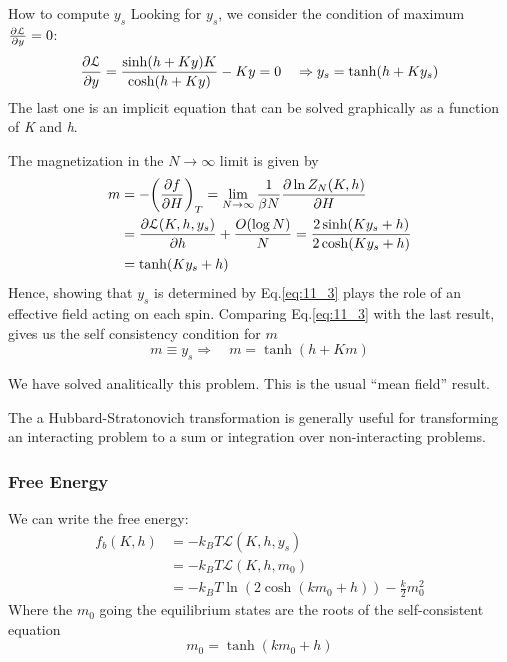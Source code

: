 \documentclass[../../Main/Main.tex]{subfiles}
\begin{document}
\begin{example}{How to compute \( y_s \)}{}
Looking for \( y_s \), we consider the condition of maximum \( \pdv{\mathcal{L} }{y} = 0  \):
\begin{equation}
  \pdv{\mathcal{L}}{y} = \frac{\sinh (h+Ky)K}{\cosh (h+Ky)} - Ky = 0 \quad   \Rightarrow y_s = \tanh (h+Ky_s)
  \label{eq:11_3}
\end{equation}
The last one is an implicit equation that can be solved graphically as a function of \emph{K} and \emph{h}.
\end{example}

The magnetization in the \( N \rightarrow \infty  \) limit is given by
\begin{equation*}
\begin{split}
m  &= - \qty( \pdv{f}{H})_T = \lim_{N \rightarrow \infty } \frac{1}{\beta N} \pdv{\ln{Z_N(K,h)} }{H}   \\
& =  \pdv{\mathcal{L} (K,h,y_s) }{h}  + \frac{O ( \log{N} )}{N} = \frac{2 \sinh(Ky_s+h)}{2 \cosh(K y_s+h)} \\
& = \tanh (K y_s +h)
\end{split}
\end{equation*}
Hence, showing that \(y_s\) is determined by Eq.\eqref{eq:11_3} plays the role of an effective field acting on each spin. Comparing Eq.\eqref{eq:11_3} with the last result, gives us the self consistency condition for \(m\)
\begin{equation}
   m \equiv y_s \Rightarrow \quad m = \tanh (h+Km)
\end{equation}
\begin{remark}
We have solved analitically this problem.
This is the usual “mean field” result.
\end{remark}
\begin{remark}
The a Hubbard-Stratonovich transformation is generally useful for transforming an interacting problem to a sum or integration over non-interacting problems.
\end{remark}

\subsubsection*{Free Energy}
We can write the free energy:
$$\begin{align}
f_{b} (K,h) &= -k_{B}T\mathcal{L}(K,h,y_{s})  \\
&= -k_{B}T\mathcal{L}(K,h,m_{0}) \\
&= -k_{B}T\ln(2\cosh(km_{0} + h)) - \frac{k}{2}m_{0}^{2}
\end{align}$$
Where the $m_{0}$ going the equilibrium states are the roots of the self-consistent equation
$$m_{0} = \tanh(km_{0} + h)$$
\end{document}
